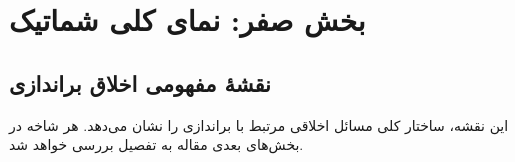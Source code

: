 \documentclass[12pt,a4paper]{article}
\begin{document}
\newpage
\tableofcontents
\newpage


\section*{بخش صفر: نمای کلی شماتیک}

\subsection*{نقشهٔ مفهومی اخلاق براندازی}

این نقشه، ساختار کلی مسائل اخلاقی مرتبط با براندازی را نشان می‌دهد. هر شاخه
در بخش‌های بعدی مقاله به تفصیل بررسی خواهد شد.
\end{document}
